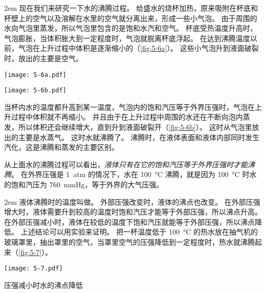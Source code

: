 \medskip\noindent
\begin{minipage}{0.6\linewidth}\parindent2em
现在我们来研究一下水的沸腾过程。
给盛水的烧杯加热，原来吸附在杯底和杯壁上的空气以及溶解在水里的空气就分离出来，形成一些小气泡。
由于周围的水向气泡里蒸发，所以气泡里包含的是饱和水汽和空气。
杯底受热温度升高时，气泡膨胀，当体积胀大到一定程度时，气泡就脱离杯底浮起。
在达到沸腾温度以前，气泡在上升过程中体积是逐渐缩小的（\cref{fig:5-6a}）。
这些小气泡升到液面破裂时，放出的主要是空气。
\end{minipage}\hfill
\begin{minipage}{0.35\linewidth}\centering
\begin{figurehere}
  \begin{minipage}{0.5\linewidth}\centering
    \texttt{[image: 5-6a.pdf]}
    \subcaption{}\label{fig:5-6a}
  \end{minipage}%
  \begin{minipage}{0.5\linewidth}\centering
    \texttt{[image: 5-6b.pdf]}
    \subcaption{}\label{fig:5-6b}
  \end{minipage}
  \caption{}\label{fig:5-6}
\end{figurehere}
\end{minipage}

\medskip
当杯内水的温度都升高到某一温度，气泡内的饱和汽压等于外界压强时，气泡在上升过程中体积就不再缩小。
并且由于在上升过程中周围的水还在不断向泡内蒸发，所以体积还会继续增大，直到升到液面破裂开（\cref{fig:5-6b}）。
这时从气泡里放出的主要是水蒸气。
这时水就沸腾了。
沸腾时，在液体表面和液体内部同时发生汽化，这是沸腾和蒸发的主要区别。

从上面水的沸腾过程可以看出，\emph{液体只有在它的饱和汽压等于外界压强时才能沸腾}。
在外界压强是 \qty{1}{atm} 的情况下，水在 \qty{100}{\celsius} 沸腾，就是因为 \qty{100}{\celsius} 时水的饱和汽压为 \qty{760}{mmHg}，等于外界的大气压强。

\medskip\noindent
\begin{minipage}{0.57\linewidth}\parindent2em
液体沸腾时的温度叫做。
外部压强改变时，液体的沸点也改变。
在外部压强增大时，液体需要升到较高的温度时饱和汽压才能等于外部压强，所以沸点升高。
在外部压强减小时，液体在较低的温度下饱和汽压就能等于外部压强，所以沸点降低。
上述结论可以用实验来证明。
把一杯温度低于 \qty{100}{\celsius} 的热水放在抽气机的玻璃罩里，抽出罩里的空气，当罩里空气的压强降低到一定程度时，热水就沸腾起来（\cref{fig:5-7}）。
\end{minipage}\hfill
\begin{minipage}{0.38\linewidth}\centering
\begin{figurehere}
  \texttt{[image: 5-7.pdf]}
  \caption{压强减小时水的沸点降低}\label{fig:5-7}
\end{figurehere}
\end{minipage}

